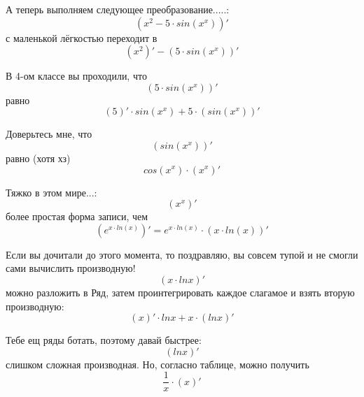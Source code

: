 \documentclass[a4paper, 12pt]{article}
\begin{document}
А теперь выполняем следующее преобразование.....:
\begin{equation}
\left(x^{2} - 5 \cdot sin\left(x^{x}\right) \right)'
\end{equation}
с маленькой лёгкостью переходит в
\begin{equation}
\left(x^{2} \right)' - \left( 5 \cdot sin\left(x^{x}\right) \right)'
\end{equation}

В 4-ом классе вы проходили, что
\begin{equation}
\left(5 \cdot sin\left(x^{x}\right) \right)'
\end{equation}
равно
\begin{equation}
\left(5 \right)' \cdot sin\left(x^{x}\right) + 5\cdot \left( sin\left(x^{x}\right) \right)'
\end{equation}

Доверьтесь мне, что
\begin{equation}
\left(sin\left(x^{x}\right) \right)'
\end{equation}
равно (хотя хз)
\begin{equation}
cos \left( x^{x} \right) \cdot \left( x^{x} \right)'
\end{equation}

Тяжко в этом мире...:
\begin{equation}
\left(x^{x} \right)'
\end{equation}
более простая форма записи, чем
\begin{equation}
\left(e^{x\cdot ln \left(x \right)}  \right)' = e^{x\cdot ln \left(x \right)} \cdot \left( x\cdot ln \left(x \right) \right)'
\end{equation}

Если вы дочитали до этого момента, то поздравляю, вы совсем тупой и не смогли сами вычислить производную!
\begin{equation}
\left(x \cdot lnx \right)'
\end{equation}
можно разложить в Ряд, затем проинтегрировать каждое слагамое и взять вторую производную:
\begin{equation}
\left(x \right)' \cdot lnx + x\cdot \left( lnx \right)'
\end{equation}

Тебе ещ ряды ботать, поэтому давай быстрее:
\begin{equation}
\left(lnx \right)'
\end{equation}
слишком сложная производная. Но, согласно таблице, можно получить
\begin{equation}
\frac{1}{x} \cdot \left(x \right)'
\end{equation}
\end{document}
